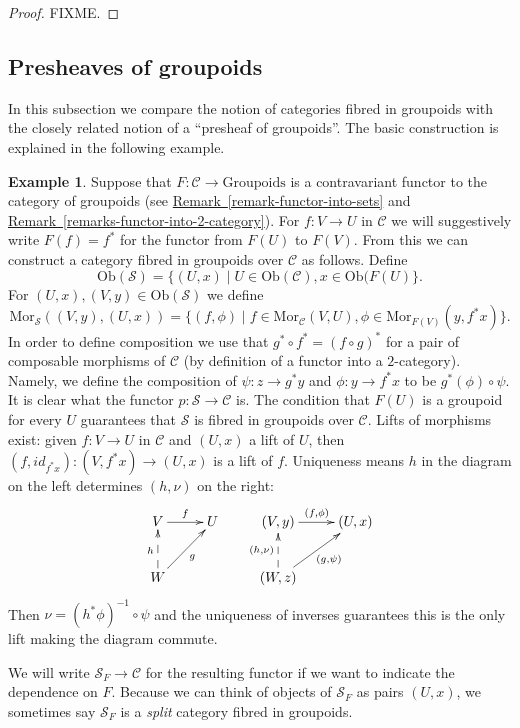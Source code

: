 \documentclass{amsart}
\theoremstyle{definition}
\newtheorem{example}[theorem]{Example}
\theoremstyle{remark}
\numberwithin{equation}{subsection}
\begin{document}
\begin{proof}
FIXME.
\end{proof}

\subsection{Presheaves of groupoids}
\label{subsection-presheaves-groupoids}

\noindent
In this subsection we compare the notion of categories fibred in groupoids
with the closely related notion of a ``presheaf of groupoids''. The basic
construction is explained in the following example.

\begin{example}
\label{example-functor-groupoids}
Suppose that $F : \mathcal{C} \to \text{Groupoids}$ is a contravariant functor
to the category of groupoids (see 
\hyperref[remark-functor-into-sets]{Remark~\ref*{remark-functor-into-sets}} and
\hyperref[remarks-functor-into-2-category]%
{Remark~\ref{remarks-functor-into-2-category}}). 
For $f : V \to U$ in $\mathcal{C}$ we will
suggestively write $F(f) = f^\ast$ for the functor from $F(U)$ to $F(V)$. 
From this we can construct a category fibred in groupoids over $\mathcal{C}$ 
as follows. Define 
$$
\text{Ob}(\mathcal{S}) =
\{(U,x) \mid U\in \text{Ob}(\mathcal{C}), x\in \text{Ob}(F(U)\}.
$$ 
For $(U,x), (V,y) \in \text{Ob}(\mathcal{S})$ we define
$$
\text{Mor}_\mathcal{S}((V,y),(U,x)) = 
\{ (f, \phi) \mid f\in \text{Mor}_\mathcal{C}(V,U), 
\phi \in \text{Mor}_{F(V)}(y, f^\ast x)\}.
$$
In order to define composition we use that $g^\ast \circ f^\ast = 
(f \circ g)^\ast$ for a pair of composable morphisms of $\mathcal{C}$
(by definition of a functor into a $2$-category).
Namely, we define the composition of $\psi : z \to g^\ast y$ and 
$ \phi : y \to f^\ast x$ to be $ g^\ast(\phi) \circ \psi$. It is clear
what the functor $p : \mathcal{S} \to \mathcal{C}$ is. The condition
that $F(U)$ is a groupoid for every $U$ guarantees that $\mathcal{S}$ is
fibred in groupoids over $\mathcal{C}$. Lifts of morphisms exist: given 
$f: V \to U$ in $\mathcal{C}$ and $(U,x)$ a lift of $U$, then 
$(f, id_{f^\ast x}): (V, {f^\ast x}) \to (U,x)$ is a lift of $f$. 
Uniqueness means $h$ in the diagram on the left determines $(h,\nu)$ on 
the right:
$$
\xymatrix{
V \ar[r]^f & U & (V,y) \ar[r]^{(f, \phi)} & (U,x) \\
W \ar@{-->}[u]^h \ar[ru]_g & &
(W,z) \ar@{-->}[u]^{(h,\nu)} \ar[ru]_{(g, \psi)} & \\
}
$$
Then $\nu = (h^\ast \phi)^{-1} \circ \psi $ and the uniqueness of inverses
guarantees this is the only lift making the diagram commute.

\noindent
We will write $\mathcal{S}_F \to \mathcal{C}$ for the resulting functor
if we want to indicate the dependence on $F$. Because we can think of 
objects of $\mathcal{S}_F$ as pairs $(U,x)$, we sometimes say $\mathcal{S}_F$ 
is a {\it split} category fibred in groupoids.
\end{example}
\end{document}
